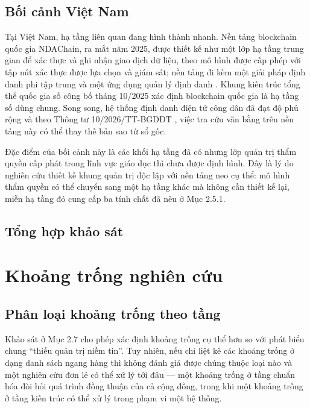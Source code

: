 \subsection{Bối cảnh Việt Nam}

Tại Việt Nam, hạ tầng liên quan đang hình thành nhanh. Nền tảng blockchain quốc gia NDAChain, ra mắt năm 2025, được thiết kế như một lớp hạ tầng trung gian để xác thực và ghi nhận giao dịch dữ liệu, theo mô hình được cấp phép với tập nút xác thực được lựa chọn và giám sát; nền tảng đi kèm một giải pháp định danh phi tập trung và một ứng dụng quản lý định danh \cite{NDAChain2025}. Khung kiến trúc tổng thể quốc gia số công bố tháng 10/2025 xác định blockchain quốc gia là hạ tầng số dùng chung. Song song, hệ thống định danh điện tử công dân đã đạt độ phủ rộng và theo Thông tư 10/2026/TT-BGDĐT \cite{TT10_2026}, việc tra cứu văn bằng trên nền tảng này có thể thay thế bản sao từ sổ gốc.

Đặc điểm của bối cảnh này là các khối hạ tầng đã có nhưng lớp quản trị thẩm quyền cấp phát trong lĩnh vực giáo dục thì chưa được định hình. Đây là lý do nghiên cứu thiết kế khung quản trị độc lập với nền tảng neo cụ thể: mô hình thẩm quyền có thể chuyển sang một hạ tầng khác mà không cần thiết kế lại, miễn hạ tầng đó cung cấp ba tính chất đã nêu ở Mục 2.5.1.

\subsection{Tổng hợp khảo sát}



\section{Khoảng trống nghiên cứu}

\subsection{Phân loại khoảng trống theo tầng}

Khảo sát ở Mục 2.7 cho phép xác định khoảng trống cụ thể hơn so với phát biểu chung {``}thiếu quản trị niềm tin{''}. Tuy nhiên, nếu chỉ liệt kê các khoảng trống ở dạng danh sách ngang hàng thì không đánh giá được chúng thuộc loại nào và một nghiên cứu đơn lẻ có thể xử lý tới đâu --- một khoảng trống ở tầng chuẩn hóa đòi hỏi quá trình đồng thuận của cả cộng đồng, trong khi một khoảng trống ở tầng kiến trúc có thể xử lý trong phạm vi một hệ thống.

